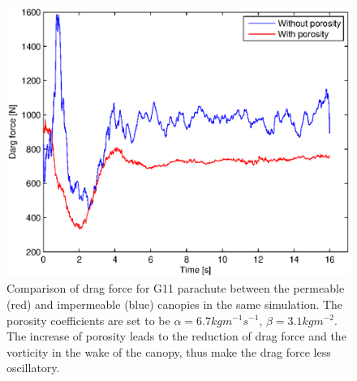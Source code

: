 \begin{figure}[!htbp] \centering
\includegraphics[width=1.0\columnwidth]{Figures/drag_compare} 
\caption{
Comparison of drag force for G11 parachute between the permeable (red) and 
impermeable (blue) canopies in the same simulation. The porosity coefficients 
are set to be $\alpha = 6.7kgm^{-1}s^{-1}$, $\beta = 3.1kgm^{-2}$. 
The increase of porosity leads to the reduction of drag force 
and the vorticity in the wake of the canopy, thus make the drag force
less oscillatory.} 
\label{fig:compare} 
\end{figure}

